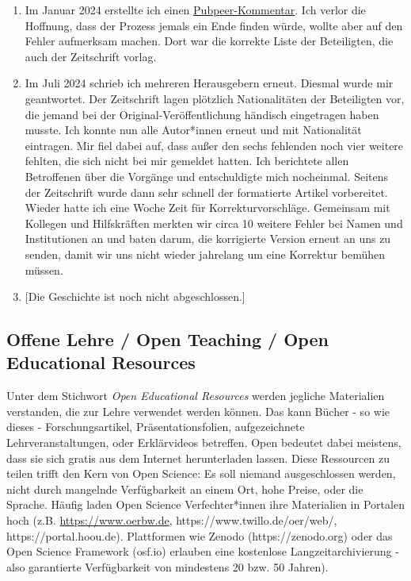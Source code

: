 \documentclass[
  letterpaper,
  DIV=11,
  numbers=noendperiod]{scrreprt}
\begin{document}
\begin{tcolorbox}
\begin{enumerate}
\item
  Im Januar 2024 erstellte ich einen
  \href{https://pubpeer.com/publications/4C94D3988E8D66520AA044DECEE0F3}{Pubpeer-Kommentar}.
  Ich verlor die Hoffnung, dass der Prozess jemals ein Ende finden
  würde, wollte aber auf den Fehler aufmerksam machen. Dort war die
  korrekte Liste der Beteiligten, die auch der Zeitschrift vorlag.
\item
  Im Juli 2024 schrieb ich mehreren Herausgebern erneut. Diesmal wurde
  mir geantwortet. Der Zeitschrift lagen plötzlich Nationalitäten der
  Beteiligten vor, die jemand bei der Original-Veröffentlichung händisch
  eingetragen haben musste. Ich konnte nun alle Autor*innen erneut und
  mit Nationalität eintragen. Mir fiel dabei auf, dass außer den sechs
  fehlenden noch vier weitere fehlten, die sich nicht bei mir gemeldet
  hatten. Ich berichtete allen Betroffenen über die Vorgänge und
  entschuldigte mich nocheinmal. Seitens der Zeitschrift wurde dann sehr
  schnell der formatierte Artikel vorbereitet. Wieder hatte ich eine
  Woche Zeit für Korrekturvorschläge. Gemeinsam mit Kollegen und
  Hilfskräften merkten wir circa 10 weitere Fehler bei Namen und
  Institutionen an und baten darum, die korrigierte Version erneut an
  uns zu senden, damit wir uns nicht wieder jahrelang um eine Korrektur
  bemühen müssen.
\item
  {[}Die Geschichte ist noch nicht abgeschlossen.{]}
\end{enumerate}

\end{tcolorbox}

\subsection{Offene Lehre / Open Teaching / Open Educational
Resources}\label{offene-lehre-open-teaching-open-educational-resources}

Unter dem Stichwort \emph{Open Educational Resources} werden jegliche
Materialien verstanden, die zur Lehre verwendet werden können. Das kann
Bücher - so wie dieses - Forschungsartikel, Präsentationsfolien,
aufgezeichnete Lehrveranstaltungen, oder Erklärvideos betreffen. Open
bedeutet dabei meistens, dass sie sich gratis aus dem Internet
herunterladen lassen. Diese Ressourcen zu teilen trifft den Kern von
Open Science: Es soll niemand ausgeschlossen werden, nicht durch
mangelnde Verfügbarkeit an einem Ort, hohe Preise, oder die Sprache.
Häufig laden Open Science Verfechter*innen ihre Materialien in Portalen
hoch (z.B. \url{https://www.oerbw.de}, https://www.twillo.de/oer/web/,
https://portal.hoou.de). Plattformen wie Zenodo (https://zenodo.org)
oder das Open Science Framework (osf.io) erlauben eine kostenlose
Langzeitarchivierung - also garantierte Verfügbarkeit von mindestens 20
bzw. 50 Jahren).
\end{document}
